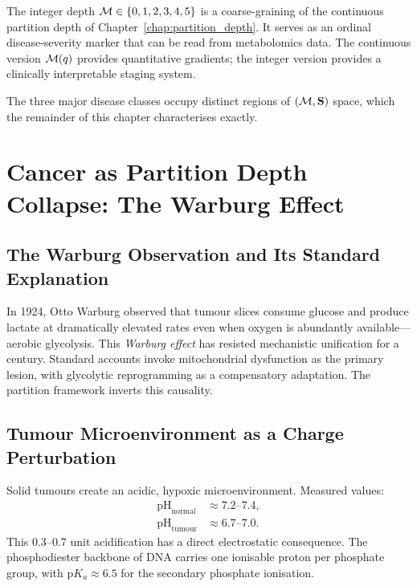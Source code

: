 \begin{remark}
The integer depth $\mathcal{M} \in \{0,1,2,3,4,5\}$ is a coarse-graining of the
continuous partition depth of Chapter~\ref{chap:partition_depth}. It serves
as an ordinal disease-severity marker that can be read from metabolomics data.
The continuous version $\mathcal{M}(q)$ provides quantitative gradients; the integer
version provides a clinically interpretable staging system.
\end{remark}

The three major disease classes occupy distinct regions of $(\mathcal{M}, \mathbf{S})$
space, which the remainder of this chapter characterises exactly.

\section{Cancer as Partition Depth Collapse: The Warburg Effect}
\label{sec:cancer_warburg}

\subsection{The Warburg Observation and Its Standard Explanation}

In 1924, Otto Warburg observed that tumour slices consume glucose and produce
lactate at dramatically elevated rates even when oxygen is abundantly
available---aerobic glycolysis. This \emph{Warburg effect} has resisted
mechanistic unification for a century. Standard accounts invoke mitochondrial
dysfunction as the primary lesion, with glycolytic reprogramming as a
compensatory adaptation. The partition framework inverts this causality.

\subsection{Tumour Microenvironment as a Charge Perturbation}

Solid tumours create an acidic, hypoxic microenvironment. Measured values:
\begin{align}
  \mathrm{pH}_{\mathrm{normal}} &\approx 7.2\text{--}7.4, \\
  \mathrm{pH}_{\mathrm{tumour}} &\approx 6.7\text{--}7.0.
\end{align}
This $0.3\text{--}0.7$ unit acidification has a direct electrostatic consequence.
The phosphodiester backbone of DNA carries one ionisable proton per phosphate
group, with $\mathrm{p}K_a \approx 6.5$ for the secondary phosphate ionisation.

